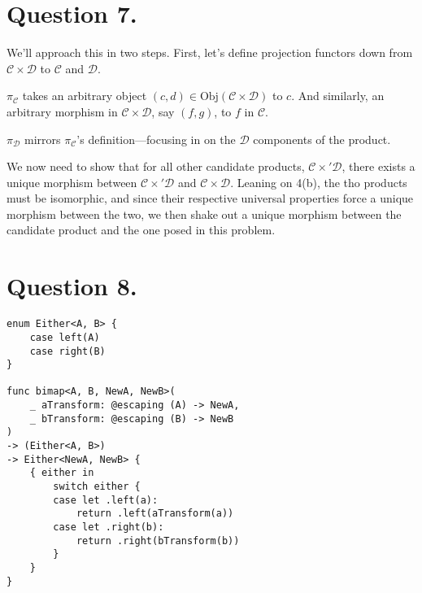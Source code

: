 \documentclass{article}
\begin{document}
\section*{Question 7.}

We’ll approach this in two steps. First, let’s define projection functors down from $\mathcal{C} \times \mathcal{D}$ to $\mathcal{C}$ and $\mathcal{D}$.

$\pi_{\mathcal{C}}$ takes an arbitrary object $(c, d) \in \textrm{Obj}(\mathcal{C} \times \mathcal{D})$ to $c$. And similarly, an arbitrary morphism in $\mathcal{C} \times \mathcal{D}$, say $(f, g)$, to $f$ in $\mathcal{C}$.

$\pi_{\mathcal{D}}$ mirrors $\pi_{\mathcal{C}}$’s definition—focusing in on the $\mathcal{D}$ components of the product.

We now need to show that for all other candidate products, $\mathcal{C} \times' \mathcal{D}$, there exists a unique morphism between $\mathcal{C} \times' \mathcal{D}$ and $\mathcal{C} \times \mathcal{D}$. Leaning on 4(b), the tho products must be isomorphic, and since their respective universal properties force a unique morphism between the two, we then shake out a unique morphism between the candidate product and the one posed in this problem.

\vfill

\section*{Question 8.}

\begin{verbatim}
enum Either<A, B> {
	case left(A)
	case right(B)
}

func bimap<A, B, NewA, NewB>(
	_ aTransform: @escaping (A) -> NewA,
	_ bTransform: @escaping (B) -> NewB
)
-> (Either<A, B>)
-> Either<NewA, NewB> {
	{ either in
		switch either {
		case let .left(a):
			return .left(aTransform(a))
		case let .right(b):
			return .right(bTransform(b))
		}
	}
}
\end{verbatim}
\end{document}
